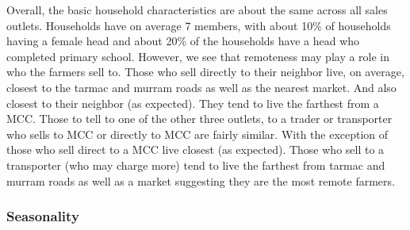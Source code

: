 \documentclass[11pt,letter,draft]{article}
\begin{document}
Overall, the basic household characteristics are about the same across all sales outlets. Households have on average 7 members, with about 10\% of households having a female head and about 20\% of the households have a head who completed primary school. However, we see that remoteness may play a role in who the farmers sell to. Those who sell directly to their neighbor live, on average, closest to the tarmac and murram roads as well as the nearest market. And also closest to their neighbor (as expected). They tend to live the farthest from a MCC. Those to tell to one of the other three outlets, to a trader or transporter who sells to MCC or directly to MCC are fairly similar. With the exception of those who sell direct to a MCC live closest (as expected). Those who sell to a transporter (who may charge more) tend to live the farthest from tarmac and murram roads as well as a market suggesting they are the most remote farmers.





\clearpage
\subsubsection{Seasonality}
\end{document}
